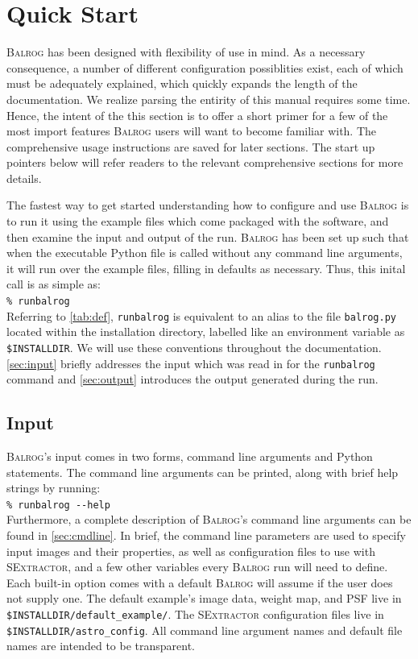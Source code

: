 \documentclass[12pt]{book}
\newcommand{\py}{Python}
\newcommand{\balrog}{\textsc{Balrog}}
\newcommand{\sex}{\textsc{SExtractor}}
\newcommand{\opt}[1]{{\texttt{-}\texttt{-#1}}}
\newcommand{\inline}{\\[0.4cm]}
\newcommand{\bcmd}[1]{\texttt{\% runbalrog #1}}
\begin{document}
\chapter{Quick Start}
\label{sec:quick}

\balrog{} has been designed with flexibility of use in mind. As a necessary consequence, 
a number of different configuration possiblities exist, each of which must be
adequately explained, which quickly expands the length of the documentation.
We realize parsing the entirity of this manual requires some time.
Hence, the intent of the this section is to offer a short primer for a few of the most import features
\balrog{} users will want to become familiar with.
The comprehensive usage instructions are saved for later sections.
The start up pointers below will refer readers to the relevant comprehensive sections for more details.

The fastest way to get started understanding how to configure and use \balrog{} is to
run it using the example files which come packaged with the software, and then examine the input
and output of the run. 
\balrog{} has been set up such that when the executable \py{}
file is called without any command line arguments, it will run over
the example files, filling in defaults as necessary. 
Thus, this inital call is as simple as:
\inline
\bcmd{}
\inline
Referring to \autoref{tab:def}, \texttt{runbalrog} is equivalent to an alias to the file
\texttt{balrog.py} located within the installation directory, labelled like an environment variable as \texttt{\$INSTALLDIR}. We will use these conventions
throughout the documentation. \autoref{sec:input} briefly addresses
the input which was read in for the \texttt{runbalrog} command and \autoref{sec:output} introduces the output
generated during the run.

\section{Input}
\label{sec:input}

\balrog{}'s input comes in two forms, command line arguments and \py{} statements.
The command line arguments can be printed, along with brief help strings by running:
\inline
\bcmd{\opt{help}}
\inline
Furthermore, a complete description of \balrog{}'s command line arguments can be found in \autoref{sec:cmdline}.
In brief, the command line parameters are used to specify input images and their properties, as well as configuration
files to use with \sex{}, and a few other variables every \balrog{} run will need to define. 
Each built-in option comes with a default \balrog{} will assume if the user does not supply one.
The default example's image data, weight map, and PSF live in \texttt{\$INSTALLDIR/default\_example/}.
The \sex{} configuration files live in \texttt{\$INSTALLDIR/astro\_config}. 
All command line argument names and default file names are intended to be transparent.
\end{document}
